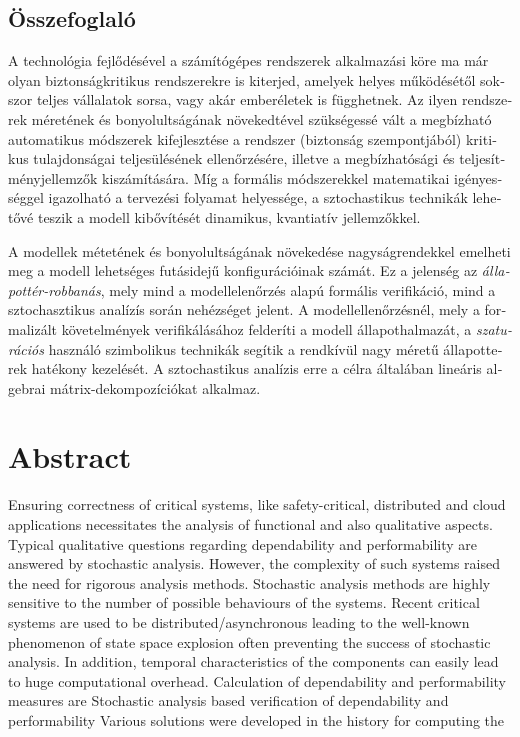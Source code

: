\begin{otherlanguage}{magyar}

  \chapter{Összefoglaló}

  A technológia fejlődésével a számítógépes rendszerek alkalmazási
  köre ma már olyan biztonságkritikus rendszerekre is kiterjed,
  amelyek helyes működésétől sokszor teljes vállalatok sorsa, vagy
  akár emberéletek is függhetnek. Az ilyen rendszerek méretének és
  bonyolultságának növekedtével szükségessé vált a megbízható
  automatikus módszerek kifejlesztése a rendszer (biztonság
  szempontjából) kritikus tulajdonságai teljesülésének ellenőrzésére,
  illetve a megbízhatósági és teljesítményjellemzők kiszámítására. Míg
  a formális módszerekkel matematikai igényességgel igazolható a
  tervezési folyamat helyessége, a sztochastikus technikák lehetővé
  teszik a modell kibővítését dinamikus, kvantiatív jellemzőkkel.

  A modellek métetének és bonyolultságának növekedése nagyságrendekkel
  emelheti meg a modell lehetséges futásidejű konfigurációinak
  számát. Ez a jelenség az \emph{állapottér-robbanás}, mely mind a
  modellelenőrzés alapú formális verifikáció, mind a sztochasztikus
  analízís során nehézséget jelent. A modellellenőrzésnél, mely a
  formalizált követelmények verifikálásához felderíti a modell
  állapothalmazát, a \emph{szaturációs} használó szimbolikus technikák
  segítik a rendkívül nagy méretű állapotterek hatékony kezelését. A
  sztochastikus analízis erre a célra általában lineáris algebrai
  mátrix-dekompozíciókat alkalmaz.

\end{otherlanguage}

\chapter{Abstract}

Ensuring correctness of critical systems, like safety-critical, distributed and cloud applications necessitates the analysis of functional and also qualitative aspects. Typical qualitative questions regarding dependability and performability are answered by stochastic analysis. However, the complexity of such systems raised the need for rigorous analysis methods. 
Stochastic analysis methods are highly sensitive to the number of possible behaviours of the systems. Recent critical systems are used to be distributed/asynchronous leading to the well-known phenomenon of state space explosion often preventing the success of stochastic analysis. In addition, temporal characteristics of the components can easily lead to huge 
computational overhead. 
Calculation of dependability and performability measures are  
Stochastic analysis based verification of dependability and performability 
Various solutions were developed in the history for computing the 

